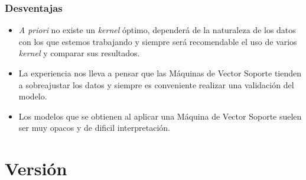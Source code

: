 \documentclass[12pt,spanish,a4paper]{article}
\numberwithin{equation}{section}
\begin{document}
\subsubsection{Desventajas}\label{desventajas}

\begin{itemize}
\item
  \emph{A priori} no existe un \emph{kernel} óptimo, dependerá de la
  naturaleza de los datos con los que estemos trabajando y siempre será
  recomendable el uso de varios \emph{kernel} y comparar sus resultados.
\item
  La experiencia nos lleva a pensar que las Máquinas de Vector Soporte
  tienden a sobreajustar los datos y siempre es conveniente realizar una
  validación del modelo.
\item
  Los modelos que se obtienen al aplicar una Máquina de Vector Soporte
  suelen ser muy opacos y de dificil interpretación.
\end{itemize}

\clearpage
\newpage

\section{Versión}\label{version}
\end{document}
